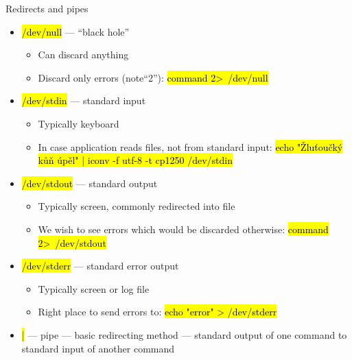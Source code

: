 \documentclass[compress, ucs, xelatex, 11pt, xcolor=svgnames,
  hyperref={
    bookmarks=true,
    unicode=true,
    colorlinks=true,
    pdftitle={Linux, command line and MetaCentrum},
    plainpages=false,
    pdfauthor={Vojtech Zeisek},
    pdfsubject={Course about use of Linux command line, writing shell scripts and using MetaCentrum of CESNET},
    pdfcreator={XeLaTeX},
    pdfkeywords={Linux, GNU, BASH, shell, command line, MetaCentrum},
    linkcolor=DarkRed,
    anchorcolor=DarkBlue,
    citecolor=Indigo,
    filecolor=NavyBlue,
    menucolor=DarkMagenta,
    urlcolor=DarkBlue,
    pdftex},
  url={hyphens, lowtilde} %
  ]{beamer}
\renewcommand{\texttt}[1]{\hl{\ttfamily #1}}
\begin{document}
\begin{frame}{Redirects and pipes}
  \label{pipe}
  \begin{itemize}
    \item \texttt{/dev/null} --- ``black hole''
    \begin{itemize}
      \item Can discard anything
      \item Discard only errors (note``2''): \texttt{command 2\textgreater~/dev/null}
    \end{itemize}
    \item \texttt{/dev/stdin} --- standard input
    \begin{itemize}
      \item Typically keyboard
      \item In case application reads files, not from standard input: \texttt{echo "Žluťoučký kůň úpěl" | iconv -f utf-8 -t cp1250 /dev/stdin}
    \end{itemize}
    \item \texttt{/dev/stdout} --- standard output
    \begin{itemize}
      \item Typically screen, commonly redirected into file
      \item We wish to see errors which would be discarded otherwise: \texttt{command 2\textgreater~/dev/stdout}
    \end{itemize}
    \item \texttt{/dev/stderr} --- standard error output
    \begin{itemize}
      \item Typically screen or log file
      \item Right place to send errors to: \texttt{echo "error" > /dev/stderr}
    \end{itemize}
    \item \texttt{|} --- pipe --- basic redirecting method --- standard output of one command to standard input of another command
  \end{itemize}
\end{frame}
\end{document}
